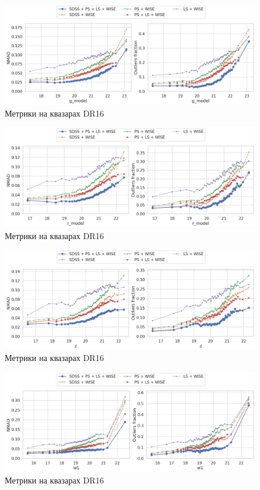 \begin{figure}
    \centering
    \includegraphics[width=\linewidth]{images/metrics-dr16qso-gmag.png}
    \caption{Метрики на квазарах DR16}
    \label{fig:metrics-dr16qso-gmag}
\end{figure}

\begin{figure}
    \centering
    \includegraphics[width=\linewidth]{images/metrics-dr16qso-rmag.png}
    \caption{Метрики на квазарах DR16}
    \label{fig:metrics-dr16qso-sng}
\end{figure}

\begin{figure}
    \centering
    \includegraphics[width=\linewidth]{images/metrics-dr16qso-zmag.png}
    \caption{Метрики на квазарах DR16}
    \label{fig:metrics-dr16qso-snw1}
\end{figure}

\begin{figure}
    \centering
    \includegraphics[width=\linewidth]{images/metrics-dr16qso-w1mag.png}
    \caption{Метрики на квазарах DR16}
    \label{fig:metrics-dr16qso-w1mag}
\end{figure}

